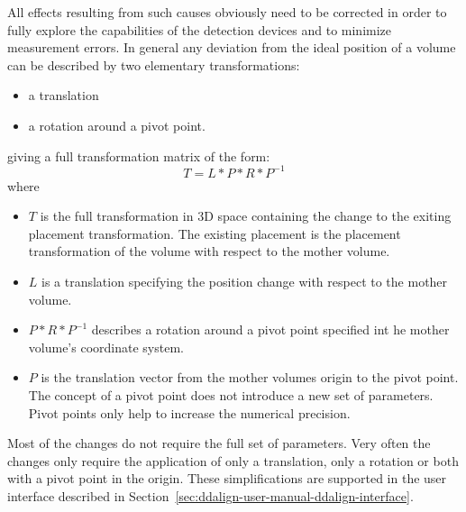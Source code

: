 \documentclass[10pt,a4paper]{article}
\begin{document}
\noindent
All effects resulting from such causes obviously need to be corrected in order to 
fully explore the capabilities of the detection devices and to minimize 
measurement errors. In general any deviation from the ideal position of a volume
can be described by two elementary transformations:
\begin{itemize}\itemcompact
\item a translation
\item a rotation around a pivot point.
\end{itemize}
giving a full transformation matrix of the form:
\begin{equation}
T = L * P * R * P^{-1}
\end{equation}
where 
\begin{itemize}\itemcompact
\item $T$ is the full transformation in 3D space containing the change to the 
exiting placement transformation. The existing placement is the placement 
transformation of the volume with respect to the mother volume.
\item $L$ is a translation specifying the position change with respect to the 
    mother volume.
\item $P * R * P^{-1}$ describes a rotation around a pivot point specified 
    int he mother volume's coordinate system.
\item $P$ is the translation vector from the mother volumes origin to the 
    pivot point. The concept of a pivot point does not introduce a new set of
    parameters. Pivot points only help to increase the numerical precision.
\end{itemize}
Most of the changes do not require the full set of parameters. Very often 
the changes only require the application of only a translation, only a rotation
or both with a pivot point in the origin. These simplifications are supported 
in the user interface described in 
Section~\ref{sec:ddalign-user-manual-ddalign-interface}.
\end{document}
